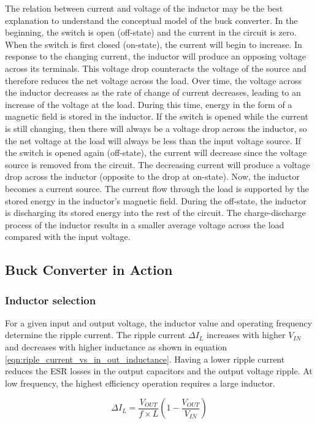 \documentclass[\main/main.tex]{subfiles}
\begin{document}
The relation between current and voltage of the inductor may be the best explanation to understand the conceptual model of the buck converter. In the beginning, the switch is open (off-state) and the current in the circuit is zero. When the switch is first closed (on-state), the current will begin to increase. In response to the changing current, the inductor will produce an opposing voltage across its terminals. This voltage drop counteracts the voltage of the source and therefore reduces the net voltage across the load. Over time, the voltage across the inductor decreases as the rate of change of current decreases, leading to an increase of the voltage at the load. During this time, energy in the form of a magnetic field is stored in the inductor. If the switch is opened while the current is still changing, then there will always be a voltage drop across the inductor, so the net voltage at the load will always be less than the input voltage source. If the switch is opened again (off-state), the current will decrease since the voltage source is removed from the circuit. The decreasing current will produce a voltage drop across the inductor (opposite to the drop at on-state). Now, the inductor becomes a current source. The current flow through the load is supported by the stored energy in the inductor's magnetic field. During the off-state, the inductor is discharging its stored energy into the rest of the circuit. The charge-discharge process of the inductor results in a smaller average voltage across the load compared with the input voltage.

\subsection{Buck Converter in Action}

\subsubsection{Inductor selection}
For a given input and output voltage, the inductor value
and operating frequency determine the ripple current. The
ripple current $\Delta I_{L}$ increases with higher $V_{IN}$ and decreases with higher inductance as shown in equation \ref{eqn:riple_current_vs_in_out_inductance}.
Having a lower ripple current reduces the ESR losses in
the output capacitors and the output voltage ripple. At low frequency, the highest efficiency operation requires a large inductor.

\begin{equation}
    \Delta I_{L} = \frac{V_{OUT}}{f\times L} \left(1 - \frac{V_{OUT}}{V_{IN}}\right)
    \label{eqn:riple_current_vs_in_out_inductance}
\end{equation}
\end{document}
